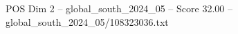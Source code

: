 \begin{textsample}{POS Dim 2 – global\_south\_2024\_05 – Score 32.00 – global\_south\_2024\_05/108323036.txt}
\end{textsample}
